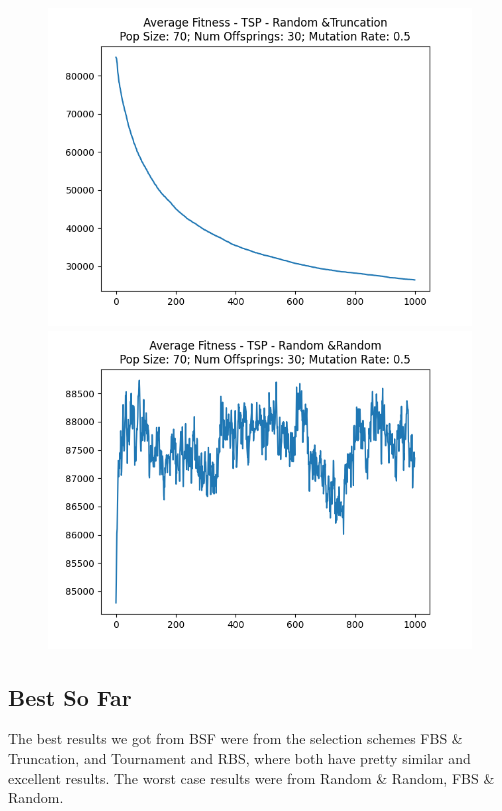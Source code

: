 \documentclass[12pt]{report}
\theoremstyle{mytheoremstyle}
\theoremstyle{mytheoremstyle}
\theoremstyle{myproblemstyle}
\begin{document}
\begin{figure}[!]
\begin{minipage}{0.4\textwidth}
		\includegraphics[width=\linewidth]{../Analysis/ASF_TSP_4_3_70_30.png}
	\end{minipage}
	\hspace{\fill}
	\begin{minipage}{0.4\textwidth}
		\includegraphics[width=\linewidth]{../Analysis/ASF_TSP_4_4_70_30.png}
	\end{minipage}
\end{figure}

\newpage

\subsection{Best So Far}
The best results we got from BSF were from the selection schemes FBS \& Truncation, and Tournament and RBS, where both have pretty similar and excellent results. The worst case results were from Random \& Random, FBS \& Random.
\end{document}
